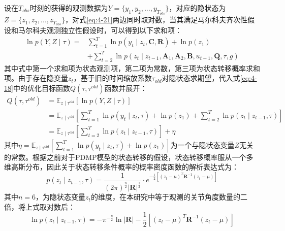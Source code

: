 设在$T_{obs}$时刻的获得的观测数据为$Y=\{y_1,y_2,...,y_{T_{obs}}\}$，对应的隐状态为$Z = \{z_1,z_2,...,z_{T_{obs}}\}$，对式\ref{eq:4-21}两边同时取对数，当其满足马尔科夫齐次性假设和马尔科夫观测独立性假设时，可以得到以下求和项：
\begin{equation}
    \begin{aligned}
    \ln p(Y, Z \mid \tau)= & \sum_{t=1}^T \ln p\left(y_t \mid z_t, \mathbf{C}, \mathbf{R}\right)+\ln p\left(z_1\right) \\
    & +\sum_{t=2}^T \ln p\left(z_t \mid z_{t-1}, \mathbf{A}_1, \mathbf{A}_2, \mathbf{B}, u_{t-1}, \mathbf{Q}, \tau, g\right)
    \end{aligned}
    \label{eq:4-20}
\end{equation}
其中式中第一个求和项为状态观测项，第二项为常数，第三项为状态转移概率求和项。由于存在隐变量$z_t$，基于旧的时间缩放系数$\tau_{old}$对隐状态求期望，代入式\ref{eq:4-18}中的优化目标函数$ Q\left(\tau, \tau^{old}\right)$函数并展开：
\begin{equation}
\begin{aligned}
    Q\left(\tau, \tau^{old}\right)
    &=\mathbb{E}_{z \mid \tau^{old}}\left[\ln p(Y, Z \mid \tau)\right]\\
    & =\mathbb{E}_{z \mid \tau^{old}}\left[\sum_{t=1}^T \ln p\left(y_t \mid z_t, \tau\right)+\ln p\left(z_1\right)+\sum_{t=2}^T \ln p\left(z_t \mid z_{t-1}, \tau\right)\right] \\
    & =\mathbb{E}_{z \mid \tau^{old}}\left[\sum_{t=2}^T \ln p\left(z_t \mid z_{t-1}, \tau\right)\right] + \eta 
\end{aligned}
\label{eq:4-21}
\end{equation}
其中$\eta=\mathbb{E}_{z \mid \tau^{old}} \left[\sum_{t=1}^T \ln p\left(y_t \mid z_t, \tau\right) + \ln p\left(z_1\right)\right]$为一个与隐状态变量$Z$无关的常数。根据之前对于PDMP模型的状态转移的假设，状态转移概率服从一个多维高斯分布，因此关于状态转移条件概率的概率密度函数的解析表达式为：
\begin{equation}
    p\left(z_t \mid z_{t-1}, \tau\right)=\frac{1}{(2 \pi)^{\frac{n}{2}}|\mathbf{R}|^{\frac{1}{2}}} \cdot e^{-\frac{1}{2}\left[\left(z_t-\mu\right)^T \mathbf{R}^{-1}\left(z_t-\mu\right)\right]}
    \label{eq:4-22}
\end{equation}
其中$n=6$，为隐状态变量$z_t$的维度，在本研究中等于观测的关节角度数量的二倍，将上式取对数后：
\begin{equation}
    \ln p\left(z_t \mid z_{t-1}, \tau\right)=-\pi^{-\frac{n}{2}}\ln\mathbf{|R|}-\frac{1}{2}\left[\left(z_t-\mu\right)^T \mathbf{R}^{-1}\left(z_t-\mu\right)\right]
    \label{eq:4-23}
\end{equation}
